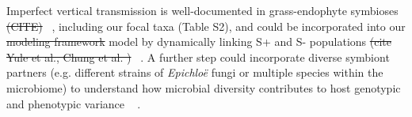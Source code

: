 \documentclass[lineno, sn-basic]{sn-jnl}%
\providecommand{\DIFadd}[1]{{\protect\color{blue}#1}} %
\providecommand{\DIFdel}[1]{{\protect\color{red}\protect\scriptsize\sout{#1}}}
\providecommand{\DIFadd}[1]{{\protect\color{blue}\uwave{#1}}} %
\providecommand{\DIFdel}[1]{{\protect\color{red}\sout{#1}}}                      %
\providecommand{\DIFaddbegin}{} %
\providecommand{\DIFaddend}{} %
\providecommand{\DIFdelbegin}{} %
\providecommand{\DIFdelend}{} %
\newcommand{\DIFscaledelfig}{0.5}
\newlength{\DIFdelgraphicswidth} %
\newlength{\DIFdelgraphicsheight} %
\newcommand{\DIFaddincludegraphics}[2][]{{\color{blue}\fbox{\DIFOincludegraphics[#1]{#2}}}} %
\newcommand{\DIFdelincludegraphics}[2][]{%
\sbox{\DIFdelgraphicsbox}{\DIFOincludegraphics[#1]{#2}}%
\settoboxwidth{\DIFdelgraphicswidth}{\DIFdelgraphicsbox} %
\settoboxtotalheight{\DIFdelgraphicsheight}{\DIFdelgraphicsbox} %
\scalebox{\DIFscaledelfig}{%
\parbox[b]{\DIFdelgraphicswidth}{\usebox{\DIFdelgraphicsbox}\\[-\baselineskip] \rule{\DIFdelgraphicswidth}{0em}}\llap{\resizebox{\DIFdelgraphicswidth}{\DIFdelgraphicsheight}{%
\setlength{\unitlength}{\DIFdelgraphicswidth}%
\begin{picture}(1,1)%
\thicklines\linethickness{2pt} %
{\color[rgb]{1,0,0}\put(0,0){\framebox(1,1){}}}%
{\color[rgb]{1,0,0}\put(0,0){\line( 1,1){1}}}%
{\color[rgb]{1,0,0}\put(0,1){\line(1,-1){1}}}%
\end{picture}%
}\hspace*{3pt}}} %
} %
\DeclareRobustCommand{\DIFaddbegin}{\DIFOaddbegin \let\includegraphics\DIFaddincludegraphics} %
\DeclareRobustCommand{\DIFaddend}{\DIFOaddend \let\includegraphics\DIFOincludegraphics} %
\DeclareRobustCommand{\DIFdelbegin}{\DIFOdelbegin \let\includegraphics\DIFdelincludegraphics} %
\DeclareRobustCommand{\DIFdelend}{\DIFOaddend \let\includegraphics\DIFOincludegraphics} %
\begin{document}
Imperfect vertical transmission is well-documented in grass-endophyte symbioses \DIFdelbegin \DIFdel{(CITE)}\DIFdelend \DIFaddbegin \DIFadd{\mbox{%
\citep{afkhami2008symbiosis}}\hspace{0pt}%
}\DIFaddend , including our focal taxa (Table S2), \DIFaddbegin \DIFadd{and }\DIFaddend could be incorporated into our \DIFdelbegin \DIFdel{modeling framework }\DIFdelend \DIFaddbegin \DIFadd{model }\DIFaddend by dynamically linking S+ and S- populations \DIFdelbegin \DIFdel{(cite Yule et al., Chung et al. )}\DIFdelend \DIFaddbegin \DIFadd{\mbox{%
\citep{yule2013costs,chung2015fungal}}\hspace{0pt}%
.
A further step could incorporate diverse symbiont partners (e.g. different strains of }\emph{\DIFadd{Epichlo\"{e}}} \DIFadd{fungi or multiple species within the microbiome) to understand how microbial diversity contributes to host genotypic and phenotypic variance \mbox{%
\citep{henry2021microbiome}}\hspace{0pt}%
}\DIFaddend .
\end{document}
